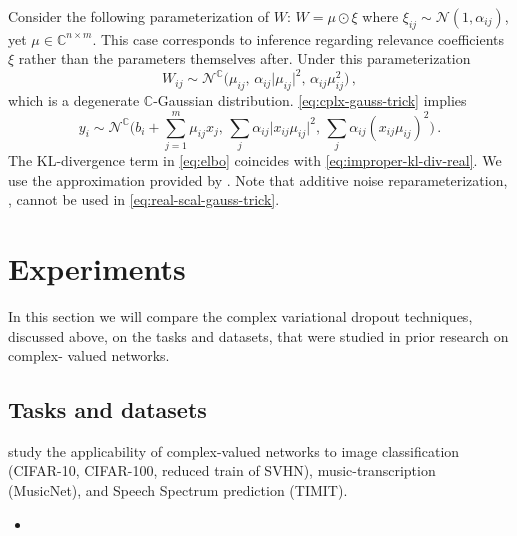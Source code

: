 \documentclass[a4paper,10pt]{article}
\newcommand{\cplx}{\mathbb{C}}
\begin{document}
Consider the following parameterization of $W$: $
  W = \mu \odot \xi
$ where $
  \xi_{ij} \sim \mathcal{N}(1, \alpha_{ij})
$, yet $\mu \in \cplx^{n \times m}$. This case corresponds to inference regarding
relevance coefficients $\xi$ rather than the parameters themselves after. Under this
parameterization
\begin{equation}  \label{eq:real-scal-gauss-vi}
  W_{ij}
    \sim \mathcal{N}^{\cplx} \bigl(
      \mu_{ij},
      \, \alpha_{ij} \lvert \mu_{ij} \rvert^2,
      \, \alpha_{ij} \mu_{ij}^2
    \bigr)
  \,,
\end{equation}
which is a degenerate $\cplx$-Gaussian distribution. \eqref{eq:cplx-gauss-trick} implies
\begin{equation}  \label{eq:real-scal-gauss-trick}
  y_i
    \sim \mathcal{N}^{\cplx}\bigl(
      b_i + \sum_{j=1}^m \mu_{ij} x_j,
      \, \sum_j \alpha_{ij} \lvert x_{ij} \mu_{ij}\rvert^2,
      \, \sum_j \alpha_{ij} (x_{ij} \mu_{ij})^2
    \bigr)
    \,.
\end{equation}
The KL-divergence term in \eqref{eq:elbo} coincides with \eqref{eq:improper-kl-div-real}.
We use the approximation provided by \citep{molchanov_variational_2017}. Note that additive
noise reparameterization, \citep{molchanov_variational_2017}, cannot be used in
\eqref{eq:real-scal-gauss-trick}.





\section{Experiments} %
\label{sec:experiments}

In this section we will compare the complex variational dropout techniques, discussed
above, on the tasks and datasets, that were studied in prior research on complex-%
valued networks.

\subsection{Tasks and datasets} %
\label{sub:tasks_and_datasets}

\citet{trabelsi_deep_2017} study the applicability of complex-valued networks to image
classification (CIFAR-10, CIFAR-100, reduced train of SVHN), music-transcription
(MusicNet), and Speech Spectrum prediction (TIMIT).
\begin{itemize}
  \item 
\end{itemize}
\end{document}
